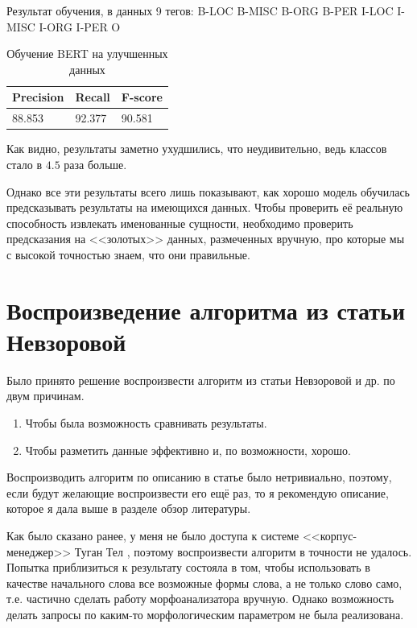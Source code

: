 Результат обучения, в данных 9 тегов:
B-LOC
B-MISC
B-ORG
B-PER
I-LOC
I-MISC
I-ORG
I-PER
O

\vspace{1cm}
\begin{table}[h]
\begin{tabular}{| l | l | l |}
\hline
Precision  &   Recall   &  F-score     \\

\hline
88.853    & 92.377    & 90.581        \\
\hline
\end{tabular}
\caption{Обучение BERT на улучшенных данных}
\end{table}

 \vspace{1cm}

Как видно, результаты заметно ухудшились, что неудивительно, ведь классов стало в $4.5$ раза больше.

Однако все эти результаты всего лишь показывают, как хорошо модель обучилась предсказывать результаты на имеющихся данных. Чтобы проверить её реальную способность извлекать именованные сущности, необходимо проверить предсказания на <<золотых>> данных, размеченных вручную, про которые мы с высокой точностью знаем, что они правильные.


\section{Воспроизведение алгоритма из статьи Невзоровой}

Было принято решение воспроизвести алгоритм из статьи Невзоровой и др. \cite{Nevzorova} по двум причинам.

\begin{enumerate}
\item Чтобы была возможность сравнивать результаты.
\item Чтобы разметить данные эффективно и, по возможности, хорошо.
\end{enumerate}


Воспроизводить алгоритм по описанию в статье было нетривиально, поэтому, если будут желающие воспроизвести его ещё раз, то я рекомендую описание, которое я дала выше в разделе обзор литературы.

Как было сказано ранее, у меня не было доступа к системе <<корпус-менеджер>> Туган Тел \cite{tugan_tel}, поэтому воспроизвести алгоритм в точности не удалось. Попытка приблизиться к результату состояла в том, чтобы использовать в качестве начального слова все возможные формы слова, а не только слово само, т.е. частично сделать работу морфоанализатора вручную. Однако возможность делать запросы по каким-то морфологическим параметром не была реализована.

